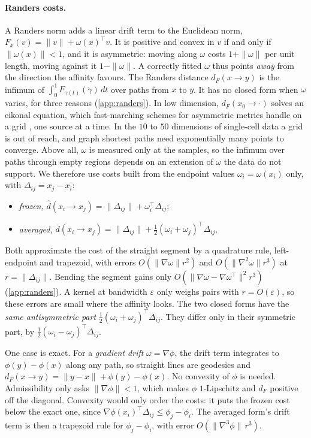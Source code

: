 \documentclass{article}
\theoremstyle{plain}
\theoremstyle{definition}
\theoremstyle{remark}
\newcommand{\eps}{\varepsilon}
\newcommand{\1}{\mathbf{1}}
\begin{document}
\paragraph{Randers costs.}
A Randers norm \citep{randers1941asymmetrical,bao2000introduction} adds a
linear drift term to the Euclidean norm, $F_x(v)=\|v\|+\omega(x)^\top v$.
It is positive and convex in $v$ if and only if $\|\omega(x)\|<1$, and it
is asymmetric: moving along $\omega$ costs $1+\|\omega\|$ per unit
length, moving against it $1-\|\omega\|$. A correctly fitted $\omega$
thus points \emph{away} from the direction the affinity favours. The
Randers distance $d_F(x\to y)$ is the infimum of
$\int_0^1F_{\gamma(t)}(\dot\gamma)\,dt$ over paths from $x$ to $y$.
It has no closed form when $\omega$ varies, for three reasons
(\cref{app:randers}). In low dimension, $d_F(x_0\to\cdot)$ solves an
eikonal equation, which fast-marching schemes for asymmetric metrics
handle on a grid \citep{sethian2003ordered,mirebeau2014efficient}, one
source at a time. In the $10$ to $50$ dimensions of single-cell data a
grid is out of reach, and graph shortest paths \citep{tenenbaum2000global}
need exponentially many points to converge. Above all, $\omega$ is
measured only at the samples, so the infimum over paths through empty
regions depends on an extension of $\omega$ the data do not support.
We therefore use costs built from the endpoint values
$\omega_i=\omega(x_i)$ only, with $\Delta_{ij}=x_j-x_i$:
\begin{itemize}
  \item \emph{frozen,}
    $\hat d(x_i\to x_j)=\|\Delta_{ij}\|+\omega_i^\top\Delta_{ij}$;
  \item \emph{averaged,}
    $\bar d(x_i\to x_j)=\|\Delta_{ij}\|+\tfrac12(\omega_i+\omega_j)^\top\Delta_{ij}$.
\end{itemize}
Both approximate the cost of the straight segment by a quadrature rule,
left-endpoint and trapezoid, with errors $O(\|\nabla\omega\|r^2)$ and
$O(\|\nabla^2\omega\|r^3)$ at $r=\|\Delta_{ij}\|$. Bending the segment
gains only $O(\|\nabla\omega-\nabla\omega^\top\|^2r^3)$
(\cref{app:randers}). A kernel at bandwidth $\eps$ only weighs pairs with
$r=O(\eps)$, so these errors are small where the affinity looks.
The two closed forms have the \emph{same antisymmetric part}
$\tfrac12(\omega_i+\omega_j)^\top\Delta_{ij}$. They differ only in their
symmetric part, by $\tfrac12(\omega_i-\omega_j)^\top\Delta_{ij}$.

One case is exact. For a \emph{gradient drift} $\omega=\nabla\phi$, the
drift term integrates to $\phi(y)-\phi(x)$ along any path, so straight
lines are geodesics and $d_F(x\to y)=\|y-x\|+\phi(y)-\phi(x)$. No
convexity of $\phi$ is needed. Admissibility only asks $\|\nabla\phi\|<1$,
which makes $\phi$ $1$-Lipschitz and $d_F$ positive off the diagonal.
Convexity would only order the costs: it puts the frozen cost below the
exact one, since $\nabla\phi(x_i)^\top\Delta_{ij}\le\phi_j-\phi_i$.
The averaged form's drift term is then a trapezoid rule for
$\phi_j-\phi_i$, with error $O(\|\nabla^3\phi\|\,r^3)$.
\end{document}
